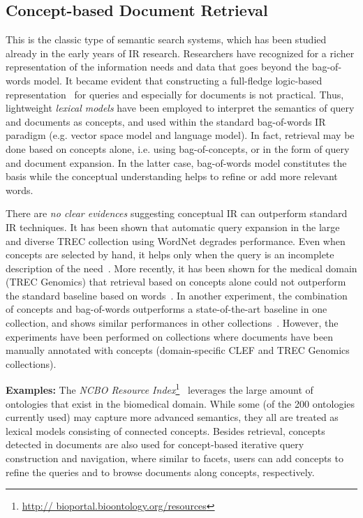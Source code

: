 \subsection{Concept-based Document Retrieval} This is the classic type of semantic search systems, which has been studied already in the early years of IR research. Researchers have recognized for a richer representation of the information needs and data that goes beyond the bag-of-words model. It became evident that constructing a full-fledge logic-based representation~\cite{DBLP:conf/sigir/Rijsbergen89} for queries and especially for documents is not practical. Thus, lightweight \emph{lexical models} have been employed to interpret the semantics of query and documents as concepts, and used within the standard bag-of-words IR paradigm (e.g. vector space model and language model). In fact, retrieval may be done based on concepts alone, i.e. using bag-of-concepts, or in the form of query and document expansion. In the latter case, bag-of-words model constitutes the basis while the conceptual understanding helps to refine or add more relevant words. 

There are \emph{no clear evidences} suggesting conceptual IR can outperform standard IR techniques. It has been shown that automatic query expansion in the large and diverse TREC collection using WordNet degrades performance. Even when concepts are selected by hand, it helps only when the query is an incomplete description of the need~\cite{DBLP:conf/sigir/Voorhees94}. More recently, it has been shown for the medical domain (TREC Genomics) that retrieval based on concepts alone could not outperform the standard baseline based on words~\cite{DBLP:conf/trec/TrieschniggKS06,DBLP:conf/trec/ZhouYTS06}. In another experiment, the combination of concepts and bag-of-words 
outperforms a state-of-the-art baseline in one collection, and shows similar performances in other collections~\cite{DBLP:journals/ipm/MeijTRK10}. However, the experiments have been performed on 
collections where documents have been manually annotated with concepts (domain-specific CLEF and TREC Genomics collections). 

\textbf{Examples:} The \emph{NCBO Resource Index}\footnote{\url{http://
bioportal.bioontology.org/resources}}~\cite{DBLP:journals/ws/JonquetLFCNMS11} leverages the large amount of ontologies that exist in the biomedical domain. While some (of the 200 ontologies currently used) may capture more advanced semantics, they all are treated as lexical models consisting of connected concepts. Besides retrieval, concepts detected in documents are also used for concept-based iterative query construction and navigation, where similar to facets, users can add concepts to refine the queries and to browse documents along concepts, respectively. 




